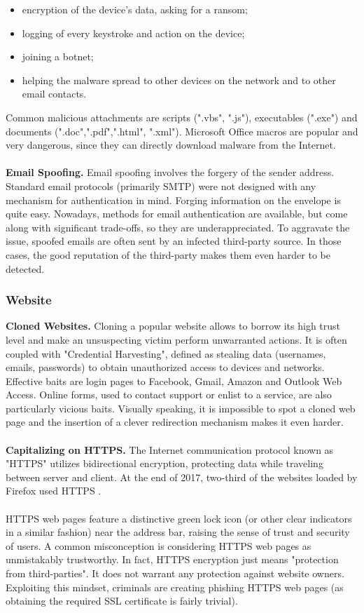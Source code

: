 \documentclass[a4paper]{article}
\begin{document}
\begin{itemize}
    \item encryption of the device's data, asking for a ransom;
    \item logging of every keystroke and action on the device;
    \item joining a botnet;
    \item helping the malware spread to other devices on the network and to other email contacts.
\end{itemize}

Common malicious attachments are scripts (".vbs", ".js"), executables (".exe") and documents (".doc",".pdf",".html", ".xml"). Microsoft Office macros are popular and very dangerous, since they can directly download malware from the Internet.
\\ \\
\noindent
\textbf{Email Spoofing.} Email spoofing involves the forgery of the sender address. Standard email protocols (primarily SMTP) were not designed with any mechanism for authentication in mind. Forging information on the envelope is quite easy. Nowadays, methods for email authentication are available, but come along with significant trade-offs, so they are underappreciated. To aggravate the issue, spoofed emails are often sent by an infected third-party source. In those cases, the good reputation of the third-party makes them even harder to be detected.

\subsubsection{Website}

\textbf{Cloned Websites.} Cloning a popular website allows to borrow its high trust level and make an unsuspecting victim perform unwarranted actions. It is often coupled with "Credential Harvesting", defined as stealing data (usernames, emails, passwords) to obtain unauthorized access to devices and networks. Effective baits are login pages to Facebook, Gmail, Amazon and Outlook Web Access. Online forms, used to contact support or enlist to a service, are also particularly vicious baits. Visually speaking, it is impossible to spot a cloned web page and the insertion of a clever redirection mechanism makes it even harder.
\\ \\
\textbf{Capitalizing on HTTPS.} The Internet communication protocol known as "HTTPS" utilizes bidirectional encryption, protecting data while traveling between server and client. At the end of 2017, two-third of the websites loaded by Firefox used HTTPS \cite{report-phishlabs-2018}. 
\\ \\
HTTPS web pages feature a distinctive green lock icon (or other clear indicators in a similar fashion) near the address bar, raising the sense of trust and security of users. A common misconception is considering HTTPS web pages as unmistakably trustworthy. In fact, HTTPS encryption just means "protection from third-parties". It does not warrant any protection against website owners. Exploiting this mindset, criminals are creating phishing HTTPS web pages (as obtaining the required SSL certificate is fairly trivial).
\end{document}
